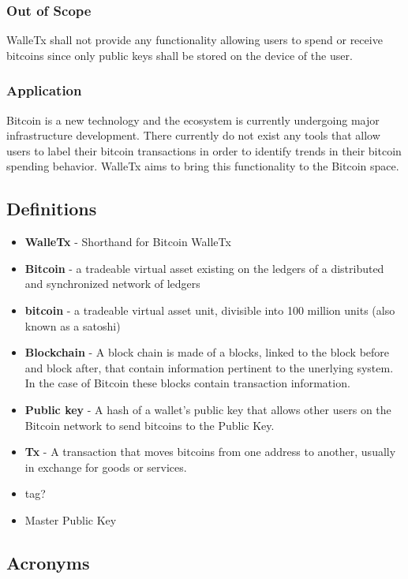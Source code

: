   \subsubsection{Out of Scope}
  WalleTx shall not provide any functionality allowing users to spend or receive bitcoins since only public keys shall be stored on the device of the user.
	
  \subsubsection{Application} 
  Bitcoin is a new technology and the ecosystem is currently undergoing major infrastructure development. There currently do not exist any tools that allow users to label their bitcoin transactions in order to identify trends in their bitcoin spending behavior. WalleTx aims to bring this functionality to the Bitcoin space.
    
	\subsection{Definitions}

	\begin{itemize}
    \item \textbf{WalleTx} - Shorthand for Bitcoin WalleTx
    \item \textbf{Bitcoin} - a tradeable virtual asset existing on the ledgers of a distributed and synchronized network of ledgers
    \item \textbf{bitcoin} - a tradeable virtual asset unit, divisible into 100 million units (also known as a satoshi) 
    \item \textbf{Blockchain} - A block chain is made of a blocks, linked to the block before and block after, that contain information pertinent to the unerlying system. In the case of Bitcoin these blocks contain transaction information.
    \item \textbf{Public key} - A hash of a wallet's public key that allows other users on the Bitcoin network to send bitcoins to the Public Key. 
    \item \textbf{Tx} - A transaction that moves bitcoins from one address to another, usually in exchange for goods or services.
    \item tag?
    \item Master Public Key
	\end{itemize}

	\subsection{Acronyms}

